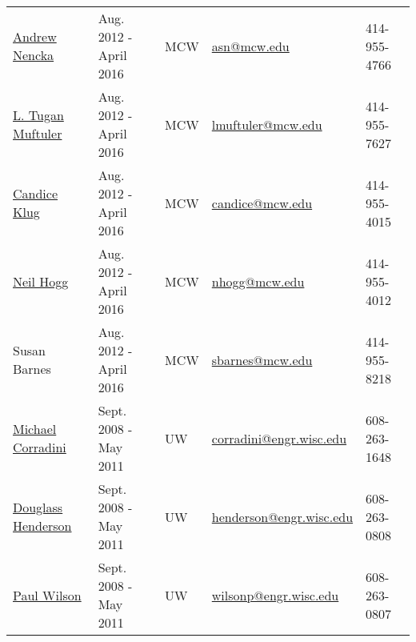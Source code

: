 
\begin{center}
\begin{minipage}{\textwidth}
\begin{tabular}{lllll}
{\href{http://www.mcw.edu/radiology/faculty/Andrew-Nencka-PhD.htm}{Andrew Nencka}}\label{andrew_nencka} & {Aug. 2012 - April 2016}  & {MCW}& \href{mailto:asn@mcw.edu}{asn@mcw.edu}  &  414-955-4766\\ %

{\href{http://neurosurgery.mcw.edu/faculty/research/muftuler/}{L. Tugan Muftuler}}\label{tugan_muftuler} & {Aug. 2012 - April 2016}  & {MCW}& \href{mailto:lmuftuler@mcw.edu}{lmuftuler@mcw.edu}  &  414-955-7627\\ %

{\href{http://www.mcw.edu/biophysics/facultyandstaff/CandiceSKlug.htm}{Candice Klug}}\label{candice_klug} & {Aug. 2012 - April 2016}  & {MCW}& \href{mailto:candice@mcw.edu}{candice@mcw.edu}  &  414-955-4015\\ %

{\href{http://www.mcw.edu/biophysics/facultyandstaff/NeilHogg.htm}{Neil Hogg}}\label{neil_hogg} & {Aug. 2012 - April 2016}  & {MCW}& \href{mailto:nhogg@mcw.edu}{nhogg@mcw.edu} & 414-955-4012 \\ %

{Susan Barnes}\label{susan_barnes} & {Aug. 2012 - April 2016} & {MCW} &  \href{mailto:sbarnes@mcw.edu}{sbarnes@mcw.edu} &   414-955-8218 \\ %

{\href{https://directory.engr.wisc.edu/ep/faculty/corradini\_michael}{Michael Corradini}} \label{michael_corradini}&{Sept. 2008 - May 2011} & {UW}  &\href{mailto:corradini@engr.wisc.edu}{corradini@engr.wisc.edu} &  608-263-1648 \\ %

{\href{https://directory.engr.wisc.edu/ep/faculty/henderson\_douglass}{Douglass Henderson}} \label{douglass_henderson}& {Sept. 2008 - May 2011}  & {UW}& \href{mailto:henderson@engr.wisc.edu}{henderson@engr.wisc.edu} &  608-263-0808 \\ %
  
{\href{https://directory.engr.wisc.edu/ep/faculty/wilson\_paul}{Paul Wilson}}\label{paul_wilson} & {Sept. 2008 - May 2011}  & {UW}& \href{mailto:wilsonp@engr.wisc.edu}{wilsonp@engr.wisc.edu} &  608-263-0807 \\ %

\end{tabular}
\end{minipage}
\end{center}

